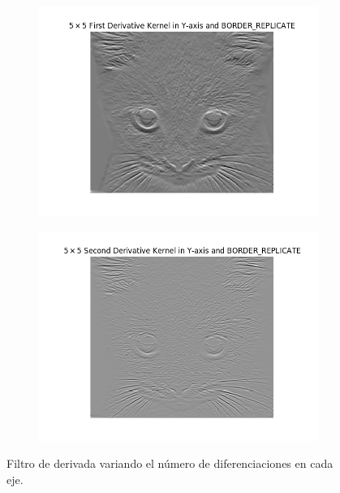 \documentclass[11pt,a4paper]{article}
\begin{document}
\begin{figure}[H]\ContinuedFloat
\begin{subfigure}{.5\textwidth}
	\centering
	\includegraphics[scale=0.45]{img/der-y1.png}
	\label{fig:der-y1}
\end{subfigure}
\begin{subfigure}{.5\textwidth}
	\centering
	\includegraphics[scale=0.45]{img/der-y2.png}
	\label{fig:der-y2}
\end{subfigure}
\caption{Filtro de derivada variando el número de diferenciaciones en cada eje.}
\label{fig:der}
\end{figure}
\end{document}
